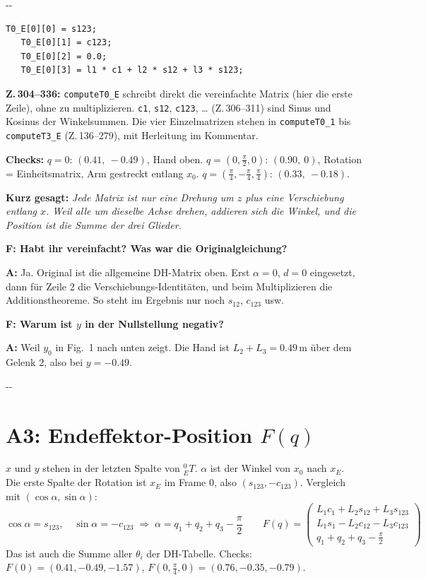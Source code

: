 \documentclass[10pt,a4paper]{article}
\makeatletter
\newcommand{\secneed}[1]{\par\penalty\@M\begingroup\setlength{\dimen@}{#1}\dimen@ii\pagegoal
  \advance\dimen@ii-\pagetotal\ifdim\dimen@>\dimen@ii\ifdim\dimen@ii>\z@\vfil\fi\penalty-\@M\fi\endgroup}
\let\oldsection\section
\renewcommand{\section}{\secneed{9\baselineskip}\oldsection}
\newcommand{\frage}[2]{\textbf{F: #1}\par\nopagebreak\vspace{1pt}\textbf{A:} #2\par\vspace{5pt}}
\newcommand{\sagen}[1]{\textbf{Kurz gesagt:} \emph{#1}\par}
\newcommand{\code}[1]{\texttt{#1}}
\makeatother
\begin{document}
\secneed{5\baselineskip}
\begin{lstlisting}[firstnumber=314]
   T0_E[0][0] = s123;
   T0_E[0][1] = c123;
   T0_E[0][2] = 0.0;
   T0_E[0][3] = l1 * c1 + l2 * s12 + l3 * s123;
\end{lstlisting}
\textbf{Z.\,304--336:} \code{computeT0\_E} schreibt direkt die vereinfachte Matrix (hier die erste Zeile), ohne zu
multiplizieren. \code{c1}, \code{s12}, \code{c123}, \ldots{} (Z.\,306--311) sind Sinus und Kosinus der Winkelsummen. Die
vier Einzelmatrizen stehen in \code{computeT0\_1} bis \code{computeT3\_E} (Z.\,136--279), mit Herleitung im Kommentar.

\textbf{Checks:} $q = 0$: $(0.41,\ -0.49)$, Hand oben. $q = (0, \frac{\pi}{2}, 0)$: $(0.90,\ 0)$, Rotation = Einheitsmatrix,
Arm gestreckt entlang $x_0$. $q = (\frac{\pi}{4}, -\frac{\pi}{4}, \frac{\pi}{4})$: $(0.33,\ -0.18)$.

\sagen{Jede Matrix ist nur eine Drehung um $z$ plus eine Verschiebung entlang $x$. Weil alle um dieselbe Achse drehen,
addieren sich die Winkel, und die Position ist die Summe der drei Glieder.}

\begin{fragen}
\frage{Habt ihr vereinfacht? Was war die Originalgleichung?}
{Ja. Original ist die allgemeine DH-Matrix oben. Erst $\alpha = 0$, $d = 0$ eingesetzt, dann für Zeile 2 die
Verschiebungs-Identitäten, und beim Multiplizieren die Additionstheoreme. So steht im Ergebnis nur noch $s_{12}$, $c_{123}$
usw.}
\frage{Warum ist $y$ in der Nullstellung negativ?}
{Weil $y_0$ in Fig.~1 nach unten zeigt. Die Hand ist $L_2 + L_3 = 0.49$\,m über dem Gelenk 2, also bei $y = -0.49$.}
\end{fragen}

\section{A3: Endeffektor-Position \texorpdfstring{$F(q)$}{F(q)}}

$x$ und $y$ stehen in der letzten Spalte von ${}^0_ET$. $\alpha$ ist der Winkel von $x_0$ nach $x_E$. Die erste Spalte der
Rotation ist $x_E$ im Frame 0, also $(s_{123}, -c_{123})$. Vergleich mit $(\cos\alpha, \sin\alpha)$:
\[
  \cos\alpha = s_{123},\quad \sin\alpha = -c_{123} \;\Rightarrow\; \alpha = q_1 + q_2 + q_3 - \frac{\pi}{2}
  \qquad
  \boxed{F(q) = \begin{pmatrix}
    L_1 c_1 + L_2 s_{12} + L_3 s_{123} \\
    L_1 s_1 - L_2 c_{12} - L_3 c_{123} \\
    q_1 + q_2 + q_3 - \frac{\pi}{2}
  \end{pmatrix}}
\]
Das ist auch die Summe aller $\theta_i$ der DH-Tabelle. Checks: $F(0) = (0.41, -0.49, -1.57)$,
$F(0, \frac{\pi}{4}, 0) = (0.76, -0.35, -0.79)$.
\end{document}
